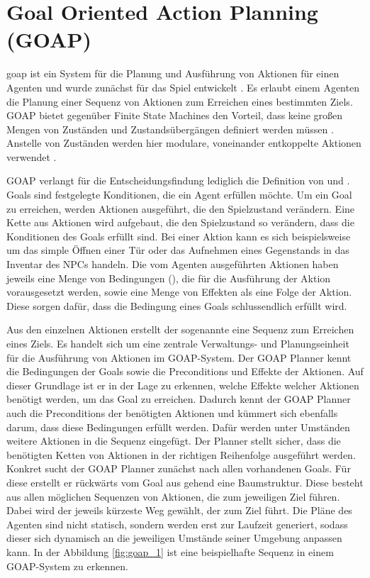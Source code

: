 \section{Goal Oriented Action Planning (GOAP)}\label{goap}
\ac{goap} ist ein System für die Planung und Ausführung von Aktionen für einen Agenten und wurde zunächst für das Spiel  entwickelt \cite{goap_fear}. Es erlaubt einem Agenten die Planung einer Sequenz von Aktionen zum Erreichen eines bestimmten Ziels. GOAP bietet gegenüber Finite State Machines den Vorteil, dass keine großen Mengen von Zuständen und Zustandsübergängen definiert werden müssen \cite{goap_gamedevelopment} \cite{game_ai_by_example}. Anstelle von Zuständen werden hier modulare, voneinander entkoppelte Aktionen verwendet \cite{goap_haw}.

GOAP verlangt für die Entscheidungsfindung lediglich die Definition von  und  \cite{ai_for_game_devs}. Goals sind festgelegte Konditionen, die ein Agent erfüllen möchte. Um ein Goal zu erreichen, werden Aktionen ausgeführt, die den Spielzustand verändern. Eine Kette aus Aktionen wird aufgebaut, die den Spielzustand so verändern, dass die Konditionen des Goals erfüllt sind. Bei einer Aktion kann es sich beispielsweise um das simple Öffnen einer Tür oder das Aufnehmen eines Gegenstands in das Inventar des NPCs handeln. Die vom Agenten ausgeführten Aktionen haben jeweils eine Menge von Bedingungen (), die für die Ausführung der Aktion vorausgesetzt werden, sowie eine Menge von Effekten als eine Folge der Aktion. Diese sorgen dafür, dass die Bedingung eines Goals schlussendlich erfüllt wird.

Aus den einzelnen Aktionen erstellt der sogenannte  eine Sequenz zum Erreichen eines Ziels. Es handelt sich um eine zentrale Verwaltungs- und Planungseinheit für die Ausführung von Aktionen im GOAP-System. Der GOAP Planner kennt die Bedingungen der Goals sowie die Preconditions und Effekte der Aktionen. Auf dieser Grundlage ist er in der Lage zu erkennen, welche Effekte welcher Aktionen benötigt werden, um das Goal zu erreichen. Dadurch kennt der GOAP Planner auch die Preconditions der benötigten Aktionen und kümmert sich ebenfalls darum, dass diese Bedingungen erfüllt werden. Dafür werden unter Umständen weitere Aktionen in die Sequenz eingefügt. Der Planner stellt sicher, dass die benötigten Ketten von Aktionen in der richtigen Reihenfolge ausgeführt werden.
Konkret sucht der GOAP Planner zunächst nach allen vorhandenen Goals. Für diese erstellt er rückwärts vom Goal aus gehend eine Baumstruktur. Diese besteht aus allen möglichen Sequenzen von Aktionen, die zum jeweiligen Ziel führen. Dabei wird der jeweils kürzeste Weg gewählt, der zum Ziel führt. Die Pläne des Agenten sind nicht statisch, sondern werden erst zur Laufzeit generiert, sodass dieser sich dynamisch an die jeweiligen Umstände seiner Umgebung anpassen kann. In der Abbildung \ref{fig:goap_1} ist eine beispielhafte Sequenz in einem GOAP-System zu erkennen.

